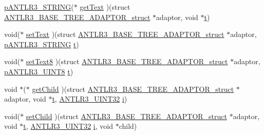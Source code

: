 \begin{DoxyCompactItemize}
\item 
\hyperlink{antlr3interfaces_8h_a36bbe7362079348864db4b4dbdcce56b}{p\-A\-N\-T\-L\-R3\-\_\-\-S\-T\-R\-I\-N\-G}($\ast$ \hyperlink{struct_a_n_t_l_r3___b_a_s_e___t_r_e_e___a_d_a_p_t_o_r__struct_aa3f28e73519bb2e10db881df11ac6147}{get\-Text} )(struct \hyperlink{struct_a_n_t_l_r3___b_a_s_e___t_r_e_e___a_d_a_p_t_o_r__struct}{A\-N\-T\-L\-R3\-\_\-\-B\-A\-S\-E\-\_\-\-T\-R\-E\-E\-\_\-\-A\-D\-A\-P\-T\-O\-R\-\_\-struct} $\ast$adaptor, void $\ast$\hyperlink{showimage_8m_ad941f6ef920fbfb3d75b60ddbedbdd39}{t})
\item 
void($\ast$ \hyperlink{struct_a_n_t_l_r3___b_a_s_e___t_r_e_e___a_d_a_p_t_o_r__struct_ad6597ca501eb621853499ee9eb5e8f8d}{set\-Text} )(struct \hyperlink{struct_a_n_t_l_r3___b_a_s_e___t_r_e_e___a_d_a_p_t_o_r__struct}{A\-N\-T\-L\-R3\-\_\-\-B\-A\-S\-E\-\_\-\-T\-R\-E\-E\-\_\-\-A\-D\-A\-P\-T\-O\-R\-\_\-struct} $\ast$adaptor, \hyperlink{antlr3interfaces_8h_a36bbe7362079348864db4b4dbdcce56b}{p\-A\-N\-T\-L\-R3\-\_\-\-S\-T\-R\-I\-N\-G} \hyperlink{showimage_8m_ad941f6ef920fbfb3d75b60ddbedbdd39}{t})
\item 
void($\ast$ \hyperlink{struct_a_n_t_l_r3___b_a_s_e___t_r_e_e___a_d_a_p_t_o_r__struct_ab78215ccfe8a2301052b1da9cae223d5}{set\-Text8} )(struct \hyperlink{struct_a_n_t_l_r3___b_a_s_e___t_r_e_e___a_d_a_p_t_o_r__struct}{A\-N\-T\-L\-R3\-\_\-\-B\-A\-S\-E\-\_\-\-T\-R\-E\-E\-\_\-\-A\-D\-A\-P\-T\-O\-R\-\_\-struct} $\ast$adaptor, \hyperlink{antlr3defs_8h_a95c800abcac5d607fd9e3e775ace78c5}{p\-A\-N\-T\-L\-R3\-\_\-\-U\-I\-N\-T8} \hyperlink{showimage_8m_ad941f6ef920fbfb3d75b60ddbedbdd39}{t})
\item 
void $\ast$($\ast$ \hyperlink{struct_a_n_t_l_r3___b_a_s_e___t_r_e_e___a_d_a_p_t_o_r__struct_a12e1d3297901df5d624fc3913fd166b6}{get\-Child} )(struct \hyperlink{struct_a_n_t_l_r3___b_a_s_e___t_r_e_e___a_d_a_p_t_o_r__struct}{A\-N\-T\-L\-R3\-\_\-\-B\-A\-S\-E\-\_\-\-T\-R\-E\-E\-\_\-\-A\-D\-A\-P\-T\-O\-R\-\_\-struct} $\ast$adaptor, void $\ast$\hyperlink{showimage_8m_ad941f6ef920fbfb3d75b60ddbedbdd39}{t}, \hyperlink{antlr3defs_8h_ac41f744abd0fd25144b9eb9d11b1dfd1}{A\-N\-T\-L\-R3\-\_\-\-U\-I\-N\-T32} \hyperlink{_read_d_m3___matlab_8m_a6f6ccfcf58b31cb6412107d9d5281426}{i})
\item 
void($\ast$ \hyperlink{struct_a_n_t_l_r3___b_a_s_e___t_r_e_e___a_d_a_p_t_o_r__struct_a849847db53d270a9d299957ed38ef32b}{set\-Child} )(struct \hyperlink{struct_a_n_t_l_r3___b_a_s_e___t_r_e_e___a_d_a_p_t_o_r__struct}{A\-N\-T\-L\-R3\-\_\-\-B\-A\-S\-E\-\_\-\-T\-R\-E\-E\-\_\-\-A\-D\-A\-P\-T\-O\-R\-\_\-struct} $\ast$adaptor, void $\ast$\hyperlink{showimage_8m_ad941f6ef920fbfb3d75b60ddbedbdd39}{t}, \hyperlink{antlr3defs_8h_ac41f744abd0fd25144b9eb9d11b1dfd1}{A\-N\-T\-L\-R3\-\_\-\-U\-I\-N\-T32} \hyperlink{_read_d_m3___matlab_8m_a6f6ccfcf58b31cb6412107d9d5281426}{i}, void $\ast$child)

\end{DoxyCompactItemize}
